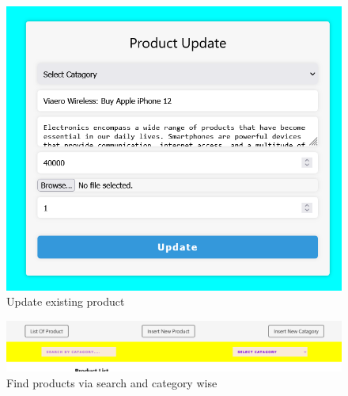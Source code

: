 \begin{figure}[ht]
    \centering  
    \includegraphics[width=\textwidth, height=0.8\textheight, keepaspectratio]{designs/update produtcs.png}    
    \caption{Update existing product}
    \label{fig:fig 6.2.26}
\end{figure}
\begin{figure}[ht]
    \centering  
    \includegraphics[width=\textwidth, height=0.8\textheight, keepaspectratio]{designs/find products.png}    
    \caption{Find products via search and category wise}
    \label{fig:fig 6.2.27}
\end{figure}
